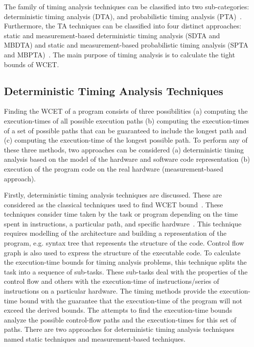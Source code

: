 The family of timing analysis techniques can be classified into two sub-categories: deterministic timing analysis (DTA), and probabilistic timing analysis (PTA)~\cite{mezzetti2015randomized}. Furthermore, the TA techniques can be classified into four distinct approaches: static and measurement-based deterministic timing analysis (SDTA and MBDTA) and static and measurement-based probabilistic timing analysis (SPTA and MBPTA)~\cite{mezzetti2015randomized}. The main purpose of timing analysis is to calculate the tight bounds of WCET.



\subsection{Deterministic Timing Analysis Techniques} 


Finding the WCET of a program consists of three possibilities (a) computing the execution-times of all possible execution paths (b) computing the execution-times of a set of possible paths that can be guaranteed to include the longest path and (c) computing the execution-time of the longest possible path.  To perform any of these three methods, two approaches can be considered (a) deterministic timing analysis based on the model of the hardware and software code representation (b) execution of the program code on the real hardware (measurement-based approach).
 
Firstly, deterministic timing analysis techniques are discussed. These are considered as the classical  techniques used to find WCET bound~\cite{wilhelm2005determining}. These techniques consider time taken by the task or program depending on the time spent in instructions, a particular path, and specific hardware~\cite{wilhelm2008worst}. This technique requires modelling of the architecture and building a representation of the program, e.g. syntax tree that represents the structure of the code. Control flow graph is also used to express the structure of the executable code. To calculate the execution-time bounds for timing analysis problems, this technique splits the task into a sequence of sub-tasks. These sub-tasks deal with the properties of the control flow and others with the execution-time of instructions/series of instructions on a particular hardware. The timing methods provide the execution-time bound with the guarantee that the execution-time of the program will not exceed the derived bounds. The attempts to find the execution-time bounds analyze the possible control-flow paths and the execution-times for this set of paths. 
There are two approaches for deterministic timing analysis techniques named static techniques and measurement-based techniques.



